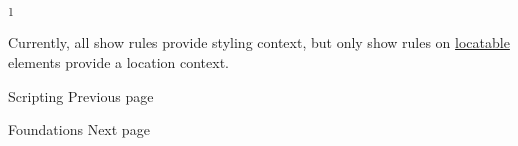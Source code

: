 \label{1}
\textsuperscript{1}

Currently, all show rules provide styling context, but only show rules
on \href{/docs/reference/introspection/location/\#locatable}{locatable}
elements provide a location context.

\href{/docs/reference/scripting/}{\pandocbounded{}}

{ Scripting } { Previous page }

\href{/docs/reference/foundations/}{\pandocbounded{}}

{ Foundations } { Next page }
